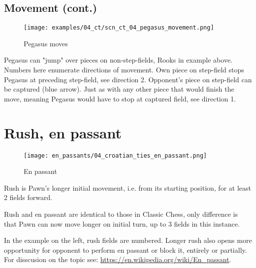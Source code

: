 \clearpage %

\subsection*{Movement (cont.)}
\label{sec:Croatian Ties/Pegasus/Movement (cont.)}

\noindent
\begin{figure}[!h]
\vspace{-1.2\baselineskip}
\texttt{[image: examples/04\_ct/scn\_ct\_04\_pegasus\_movement.png]}
\caption{Pegasus moves}
\label{fig:scn_ct_04_pegasus_movement}
\end{figure}

Pegasus can "jump" over pieces on non-step-fields, Rooks in example above. Numbers
here enumerate directions of movement. Own piece on step-field stops Pegasus at
preceding step-field, see direction 2. Opponent's piece on step-field can be captured
(blue arrow). Just as with any other piece that would finish the move, meaning Pegasus
would have to stop at captured field, see direction 1.

\clearpage %

\section*{Rush, en passant}
\label{sec:Croatian Ties/Rush, en passant}

\noindent
\begin{wrapfigure}{l}{0.4\textwidth}
\centering
\texttt{[image: en\_passants/04\_croatian\_ties\_en\_passant.png]}
\caption{En passant}
\label{fig:04_croatian_ties_en_passant}
\end{wrapfigure}
Rush is Pawn's longer initial movement, i.e. from its starting position, for at least
2 fields forward.

Rush and en passant are identical to those in Classic Chess, only difference is that Pawn
can now move longer on initial turn, up to 3 fields in this instance.

In the example on the left, rush fields are numbered. Longer rush also opens more opportunity
for opponent to perform en passant or block it, entirely or partially. For disscusion on the
topic see:
\href{https://en.wikipedia.org/wiki/En\_passant}{https://en.wikipedia.org/wiki/En\_passant}.

